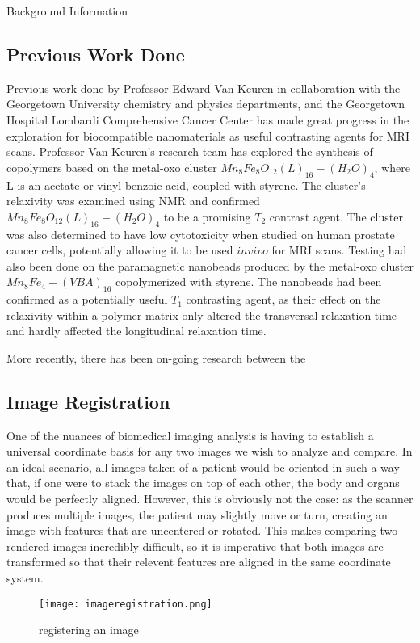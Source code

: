 \documentclass[a4paper,12pt]{article}
\begin{document}
\begin{section}{Background Information}
\subsection{Previous Work Done}
Previous work done by Professor Edward Van Keuren in collaboration with the Georgetown University chemistry and physics departments, and the Georgetown Hospital Lombardi Comprehensive Cancer Center has made great progress in the exploration for biocompatible nanomaterials as useful contrasting agents for MRI scans. Professor Van Keuren's research team has explored the synthesis of copolymers based on the metal-oxo cluster $Mn_8 Fe_8 O_{12}(L)_{16}-(H_2 O)_4$, where L is an acetate or vinyl benzoic acid, coupled with styrene\cite[p.~9040]{1}. The cluster's relaxivity was examined using NMR and confirmed $Mn_8 Fe_8 O_{12}(L)_{16}-(H_2 O)_4$ to be a promising $T_2$ contrast agent. The cluster was also determined to have low cytotoxicity when studied on human prostate cancer cells, potentially allowing it to be used $in vivo$ for MRI scans\cite[p.~9040]{1}. Testing had also been done on the paramagnetic nanobeads produced by the metal-oxo cluster $Mn_8 Fe_4 - (VBA)_{16}$ copolymerized with styrene. The nanobeads had been confirmed as a potentially useful $T_1$ contrasting agent, as their effect on the relaxivity within a polymer matrix only altered the transversal relaxation time and hardly affected the longitudinal relaxation time\cite{1}.

More recently, there has been on-going research between the 

\subsection{Image Registration}

One of the nuances of biomedical imaging analysis is having to establish a universal coordinate basis for any two images we wish to analyze and compare. In an ideal scenario, all images taken of a patient would be oriented in such a way that, if one were to stack the images on top of each other, the body and organs would be perfectly aligned. However, this is obviously not the case: as the scanner produces multiple images, the patient may slightly move or turn, creating an image with features that are uncentered or rotated. This makes comparing two rendered images incredibly difficult, so it is imperative that both images are transformed so that their relevent features are aligned in the same coordinate system. 

\begin{wrapfigure}{R}{0.3\textwidth}
\begin{center}
\centering
\texttt{[image: imageregistration.png]}
\caption{registering an image}
\end{center}
\end{wrapfigure}


\end{section}
\end{document}
